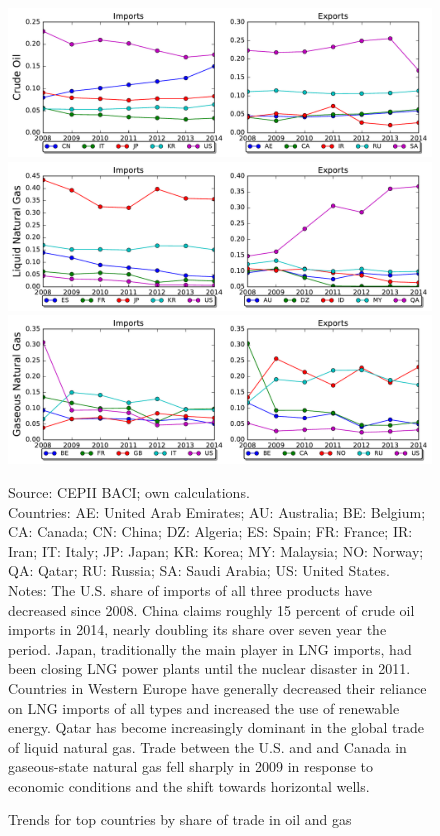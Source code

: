 \documentclass[10pt,letterpaper]{article}
\begin{document}
\begin{figure}[!htb]
  \caption{Trends for top countries by share of trade in oil and gas}
  {\centering
\includegraphics[scale=0.59]{plots/270900.pdf} \\
\includegraphics[scale=0.59]{plots/271111.pdf} \\
\includegraphics[scale=0.59]{plots/271121.pdf} \\ \par
} 
\footnotesize{Source: CEPII BACI; own calculations. \\
Countries: AE: United Arab Emirates; AU: Australia; BE: Belgium; CA: Canada; CN: China; DZ: Algeria; ES: Spain; FR: France; IR: Iran; IT: Italy; JP: Japan; KR: Korea; MY: Malaysia; NO: Norway; QA: Qatar; RU: Russia; SA: Saudi Arabia; US: United States.\\ 
Notes: The U.S. share of imports of all three products have decreased since 2008. China claims roughly 15 percent of crude oil imports in 2014, nearly doubling its share over seven year the period. Japan, traditionally the main player in LNG imports, had been closing LNG power plants until the nuclear disaster in 2011. Countries in Western Europe have generally decreased their reliance on LNG imports of all types and increased the use of renewable energy. Qatar has become increasingly dominant in the global trade of liquid natural gas. Trade between the U.S. and and Canada in gaseous-state natural gas fell sharply in 2009 in response to economic conditions and the shift towards horizontal wells. }
\end{figure}
\end{document}
